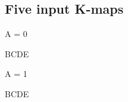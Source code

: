 
\subsection{Five input K-maps}

A = 0
\begin{Karnaugh}{BC}{DE}
\end{Karnaugh} \hfill
A = 1
\begin{Karnaugh}{BC}{DE}
\end{Karnaugh}

